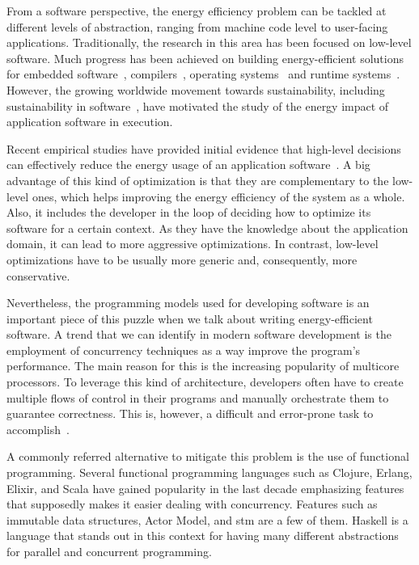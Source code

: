 From a software perspective, the energy efficiency problem can be tackled at different levels of abstraction, ranging from machine code level to user-facing applications. Traditionally, the research in this area has been focused on low-level software. Much progress has been achieved on building energy-efficient solutions for embedded software~\cite{tiwari:1994}, compilers~\cite{hsu:2003}, operating systems~\cite{merkel:2006} and runtime systems~\cite{ribic:2014, farkas:2000}. However, the growing worldwide movement towards sustainability, including sustainability in software~\cite{becker:2015}, have motivated the study of the energy impact of application software in execution.

Recent empirical studies have provided initial evidence that high-level decisions can effectively reduce the energy usage of an application software~\cite{hindle:2012,trefethen:2013,pinto:2014,sahin:2014}. A big advantage of this kind of optimization is that they are complementary to the low-level ones, which helps improving the energy efficiency of the system as a whole. Also, it includes the developer in the loop of deciding how to optimize its software for a certain context. As they have the knowledge about the application domain, it can lead to more aggressive optimizations. In contrast, low-level optimizations have to be usually more generic and, consequently, more conservative.

Nevertheless, the programming models used for developing software is an important piece of this puzzle when we talk about writing energy-efficient software. A trend that we can identify in modern software development is the employment of concurrency techniques as a way improve the program's performance. The main reason for this is the increasing popularity of multicore processors. To leverage this kind of architecture, developers often have to create multiple flows of control in their programs and manually orchestrate them to guarantee correctness. This is, however, a difficult and error-prone task to accomplish~\cite{sutter:2005,herlihy:2012}.

A commonly referred alternative to mitigate this problem is the use of functional programming. Several functional programming languages such as Clojure, Erlang, Elixir, and Scala have gained popularity in the last decade emphasizing features that supposedly makes it easier dealing with concurrency. Features such as immutable data structures, Actor Model, and \acl{stm} are a few of them. Haskell is a language that stands out in this context for having many different abstractions for parallel and concurrent programming.

